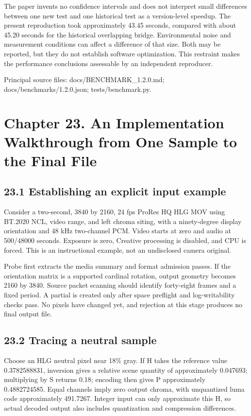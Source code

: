 \documentclass[11pt,a4paper,openany]{book}
\begin{document}
The paper invents no confidence intervals and does not interpret small differences between one new test and one historical test as a version-level speedup. The present reproduction took approximately 43.45 seconds, compared with about 45.20 seconds for the historical overlapping bridge. Environmental noise and measurement conditions can affect a difference of that size. Both may be reported, but they do not establish software optimization. This restraint makes the performance conclusions assessable by an independent reproducer.


\par\small Principal source files: docs/BENCHMARK\_1.2.0.md; docs/benchmarks/1.2.0.json; tests/benchmark.py.\normalsize

\chapter*{Chapter 23. An Implementation Walkthrough from One Sample to the Final File}

\section*{23.1 Establishing an explicit input example}
Consider a two-second, 3840 by 2160, 24 fps ProRes HQ HLG MOV using BT.2020 NCL, video range, and left chroma siting, with a ninety-degree display orientation and 48 kHz two-channel PCM. Video starts at zero and audio at 500/48000 seconds. Exposure is zero, Creative processing is disabled, and CPU is forced. This is an instructional example, not an undisclosed camera original.

Probe first extracts the media summary and format admission passes. If the orientation matrix is a supported cardinal rotation, output geometry becomes 2160 by 3840. Source packet scanning should identify forty-eight frames and a fixed period. A partial is created only after space preflight and log-writability checks pass. No pixels have changed yet, and rejection at this stage produces no final output file.


\section*{23.2 Tracing a neutral sample}
Choose an HLG neutral pixel near 18\% gray. If H takes the reference value 0.3782588831, inversion gives a relative scene quantity of approximately 0.047693; multiplying by S returns 0.18; encoding then gives P approximately 0.4882724585. Equal channels imply zero output chroma, with unquantized luma code approximately 491.7267. Integer input can only approximate this H, so actual decoded output also includes quantization and compression differences.
\end{document}
